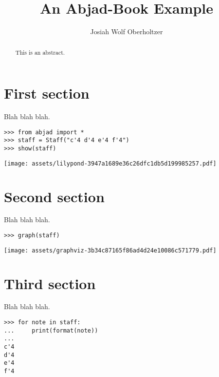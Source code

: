 \documentclass[10pt]{article}
\title{An Abjad-Book Example}
\author{Josiah Wolf Oberholtzer}
\begin{document}
\maketitle

\begin{abstract}
This is an abstract.
\end{abstract}

\section{First section}

Blah blah blah.

\begin{comment}
<abjad>
from abjad import *
staff = Staff("c'4 d'4 e'4 f'4")
show(staff)
</abjad>
\end{comment}

\begin{lstlisting}
>>> from abjad import *
>>> staff = Staff("c'4 d'4 e'4 f'4")
>>> show(staff)
\end{lstlisting}
\noindent\texttt{[image: assets/lilypond-3947a1689e36c26dfc1db5d199985257.pdf]}

\section{Second section}

Blah blah blah.

\begin{comment}
<abjad>
graph(staff)
</abjad>
\end{comment}

\begin{lstlisting}
>>> graph(staff)
\end{lstlisting}
\noindent\texttt{[image: assets/graphviz-3b34c87165f86ad4d24e10086c571779.pdf]}

\section{Third section}

Blah blah blah.

\begin{comment}
<abjad>
for note in staff:
    print(format(note))
</abjad>
\end{comment}

\begin{lstlisting}
>>> for note in staff:
...     print(format(note))
...
c'4
d'4
e'4
f'4
\end{lstlisting}
\end{document}

